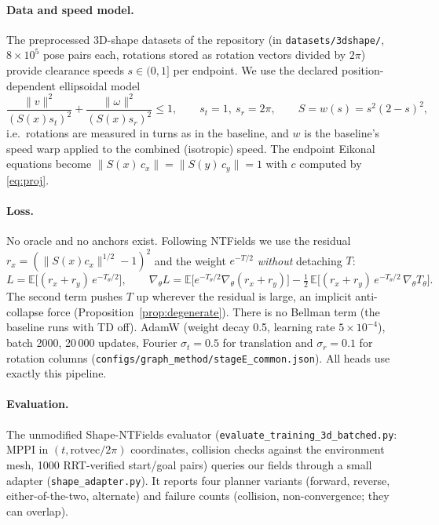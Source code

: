 \documentclass[11pt]{article}
\newcommand{\code}[1]{\texttt{#1}}
\begin{document}
\paragraph{Data and speed model.}\sloppy The preprocessed 3D-shape datasets of the repository
(in \code{datasets/3dshape/}, $8\times10^5$ pose pairs each, rotations stored as
rotation vectors divided by $2\pi$) provide clearance speeds $s\in(0,1]$ per endpoint. We use the
declared position-dependent ellipsoidal model
\begin{equation}
\frac{\|v\|^2}{(S(x)s_t)^2}+\frac{\|\omega\|^2}{(S(x)s_r)^2}\le1,\qquad s_t=1,\ s_r=2\pi,\qquad
S=w(s)=s^2(2-s)^2,
\end{equation}
i.e.\ rotations are measured in turns as in the baseline, and $w$ is the baseline's speed warp
applied to the combined (isotropic) speed. The endpoint Eikonal equations become
$\|S(x)\,c_x\|=\|S(y)\,c_y\|=1$ with $c$ computed by \eqref{eq:proj}.\fussy

\paragraph{Loss.} No oracle and no anchors exist. Following NTFields we use the residual
$r_x=(\|S(x)c_x\|^{1/2}-1)^2$ and the weight $e^{-T/2}$ \emph{without} detaching $T$:
\begin{equation}
L=\mathbb E\bigl[(r_x+r_y)\,e^{-T_\theta/2}\bigr],\qquad
\nabla_\theta L=\mathbb E\bigl[e^{-T_\theta/2}\nabla_\theta(r_x+r_y)\bigr]
-\tfrac12\,\mathbb E\bigl[(r_x+r_y)\,e^{-T_\theta/2}\,\nabla_\theta T_\theta\bigr].
\end{equation}
The second term pushes $T$ up wherever the residual is large, an implicit anti-collapse force
(Proposition~\ref{prop:degenerate}). There is no Bellman term (the baseline runs with TD off). AdamW
(weight decay 0.5, learning rate $5\times10^{-4}$), batch 2000, 20\,000 updates, Fourier
$\sigma_t=0.5$ for translation and $\sigma_r=0.1$ for rotation columns
(\code{configs/graph\_method/stageE\_common.json}). All heads use exactly this pipeline.

\paragraph{Evaluation.} The unmodified Shape-NTFields evaluator (\code{evaluate\_training\_3d\_batched.py}:
MPPI in $(t,\text{rotvec}/2\pi)$ coordinates, collision checks against the environment mesh, 1000
RRT-verified start/goal pairs) queries our fields through a small adapter
(\code{shape\_adapter.py}). It reports four planner variants (forward, reverse, either-of-the-two,
alternate) and failure counts (collision, non-convergence; they can overlap).
\end{document}
